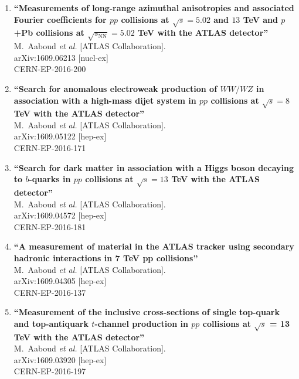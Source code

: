 \documentclass{article}
\begin{document}
\begin{enumerate}
\item%
{\bf ``Measurements of long-range azimuthal anisotropies and associated Fourier coefficients for $pp$ collisions at $\sqrt{s}=5.02$ and $13$ TeV and $p$+Pb collisions at $\sqrt{s_{\mathrm{NN}}}=5.02$ TeV with the ATLAS detector''}
  \\{}M.~Aaboud {\it et al.} [ATLAS Collaboration].
  \\{}arXiv:1609.06213 [nucl-ex]
  \\{}CERN-EP-2016-200
\item%
{\bf ``Search for anomalous electroweak production of $WW/WZ$ in association with a high-mass dijet system in $pp$ collisions at $\sqrt{s}=8$ TeV with the ATLAS detector''}
  \\{}M.~Aaboud {\it et al.} [ATLAS Collaboration].
  \\{}arXiv:1609.05122 [hep-ex]
  \\{}CERN-EP-2016-171
\item%
{\bf ``Search for dark matter in association with a Higgs boson decaying to $b$-quarks in $pp$ collisions at $\sqrt{s} = 13$ TeV with the ATLAS detector''}
  \\{}M.~Aaboud {\it et al.} [ATLAS Collaboration].
  \\{}arXiv:1609.04572 [hep-ex]
  \\{}CERN-EP-2016-181

\item%
{\bf ``A measurement of material in the ATLAS tracker using secondary hadronic interactions in 7 TeV pp collisions''}
  \\{}M.~Aaboud {\it et al.} [ATLAS Collaboration].
  \\{}arXiv:1609.04305 [hep-ex]
  \\{}CERN-EP-2016-137
\item%
{\bf ``Measurement of the inclusive cross-sections of single top-quark and top-antiquark $t$-channel production in $pp$ collisions at $\sqrt{s}$ = 13 TeV with the ATLAS detector''}
  \\{}M.~Aaboud {\it et al.} [ATLAS Collaboration].
  \\{}arXiv:1609.03920 [hep-ex]
  \\{}CERN-EP-2016-197


\end{enumerate}
\end{document}
